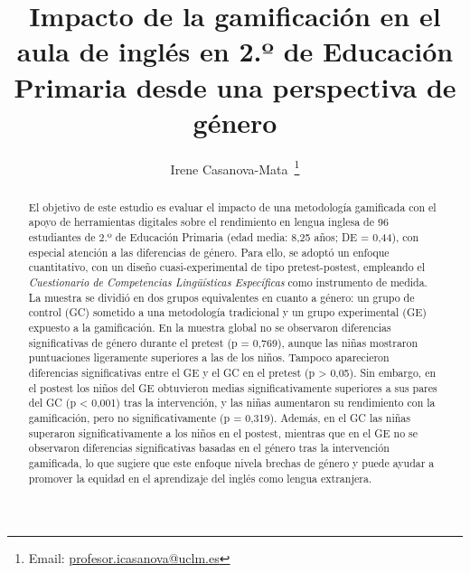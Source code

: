 \documentclass[spanish]{textolivre}
\title{Impacto de la gamificación en el aula de inglés en 2.º de Educación Primaria desde una perspectiva de género}
\author[1]{Irene Casanova-Mata~\orcid{0009-0005-0445-2260}\thanks{Email: \href{mailto:profesor.icasanova@uclm.es}{profesor.icasanova@uclm.es}}}
\affil[1]{Universidad de Castilla-La Mancha (UCLM), Facultad de Educación Lorenzo Luzuriaga, Ciudad Real, España.}
\begin{document}
\maketitle

\begin{polyabstract}
\begin{abstract}
El objetivo de este estudio es evaluar el impacto de una metodología gamificada con el apoyo de herramientas digitales sobre el rendimiento en lengua inglesa de 96 estudiantes de 2.º de Educación Primaria (edad media: 8,25 años; DE = 0,44), con especial atención a las diferencias de género. Para ello, se adoptó un enfoque cuantitativo, con un diseño cuasi-experimental de tipo pretest-postest, empleando el \textit{Cuestionario de Competencias Lingüísticas Específicas} como instrumento de medida. La muestra se dividió en dos grupos equivalentes en cuanto a género: un grupo de control (GC) sometido a una metodología tradicional y un grupo experimental (GE) expuesto a la gamificación. En la muestra global no se observaron diferencias significativas de género durante el pretest (p = 0,769), aunque las niñas mostraron puntuaciones ligeramente superiores a las de los niños. Tampoco aparecieron diferencias significativas entre el GE y el GC en el pretest (p > 0,05). Sin embargo, en el postest los niños del GE obtuvieron medias significativamente superiores a sus pares del GC (p < 0,001) tras la intervención, y las niñas aumentaron su rendimiento con la gamificación, pero no significativamente (p = 0,319). Además, en el GC las niñas superaron significativamente a los niños en el postest, mientras que en el GE no se observaron diferencias significativas basadas en el género tras la intervención gamificada, lo que sugiere que este enfoque nivela brechas de género y puede ayudar a promover la equidad en el aprendizaje del inglés como lengua extranjera.
\end{abstract}


\end{polyabstract}
\end{document}

